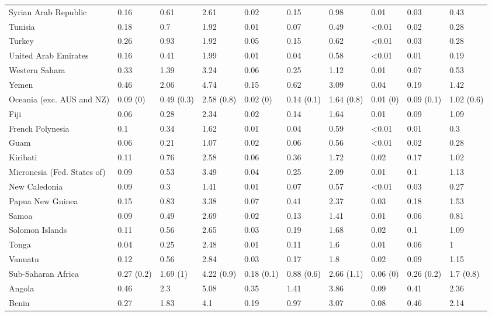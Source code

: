 \begin{longtable}[t]{llllllllll}
\addlinespace
Syrian Arab Republic & 0.16 & 0.61 & 2.61 & 0.02 & 0.15 & 0.98 & 0.01 & 0.03 & 0.43\\
Tunisia & 0.18 & 0.7 & 1.92 & 0.01 & 0.07 & 0.49 & <0.01 & 0.02 & 0.28\\
Turkey & 0.26 & 0.93 & 1.92 & 0.05 & 0.15 & 0.62 & <0.01 & 0.03 & 0.28\\
United Arab Emirates & 0.16 & 0.41 & 1.99 & 0.01 & 0.04 & 0.58 & <0.01 & 0.01 & 0.19\\
Western Sahara & 0.33 & 1.39 & 3.24 & 0.06 & 0.25 & 1.12 & 0.01 & 0.07 & 0.53\\
\addlinespace
Yemen & 0.46 & 2.06 & 4.74 & 0.15 & 0.62 & 3.09 & 0.04 & 0.19 & 1.42\\
Oceania (exc. AUS and NZ) & 0.09 (0) & 0.49 (0.3) & 2.58 (0.8) & 0.02 (0) & 0.14 (0.1) & 1.64 (0.8) & 0.01 (0) & 0.09 (0.1) & 1.02 (0.6)\\
Fiji & 0.06 & 0.28 & 2.34 & 0.02 & 0.14 & 1.64 & 0.01 & 0.09 & 1.09\\
French Polynesia & 0.1 & 0.34 & 1.62 & 0.01 & 0.04 & 0.59 & <0.01 & 0.01 & 0.3\\
Guam & 0.06 & 0.21 & 1.07 & 0.02 & 0.06 & 0.56 & <0.01 & 0.02 & 0.28\\
\addlinespace
Kiribati & 0.11 & 0.76 & 2.58 & 0.06 & 0.36 & 1.72 & 0.02 & 0.17 & 1.02\\
Micronesia (Fed. States of) & 0.09 & 0.53 & 3.49 & 0.04 & 0.25 & 2.09 & 0.01 & 0.1 & 1.13\\
New Caledonia & 0.09 & 0.3 & 1.41 & 0.01 & 0.07 & 0.57 & <0.01 & 0.03 & 0.27\\
Papua New Guinea & 0.15 & 0.83 & 3.38 & 0.07 & 0.41 & 2.37 & 0.03 & 0.18 & 1.53\\
Samoa & 0.09 & 0.49 & 2.69 & 0.02 & 0.13 & 1.41 & 0.01 & 0.06 & 0.81\\
\addlinespace
Solomon Islands & 0.11 & 0.56 & 2.65 & 0.03 & 0.19 & 1.68 & 0.02 & 0.1 & 1.09\\
Tonga & 0.04 & 0.25 & 2.48 & 0.01 & 0.11 & 1.6 & 0.01 & 0.06 & 1\\
Vanuatu & 0.12 & 0.56 & 2.84 & 0.03 & 0.17 & 1.8 & 0.02 & 0.09 & 1.15\\
Sub-Saharan Africa & 0.27 (0.2) & 1.69 (1) & 4.22 (0.9) & 0.18 (0.1) & 0.88 (0.6) & 2.66 (1.1) & 0.06 (0) & 0.26 (0.2) & 1.7 (0.8)\\
Angola & 0.46 & 2.3 & 5.08 & 0.35 & 1.41 & 3.86 & 0.09 & 0.41 & 2.36\\
\addlinespace
Benin & 0.27 & 1.83 & 4.1 & 0.19 & 0.97 & 3.07 & 0.08 & 0.46 & 2.14\\

\end{longtable}

